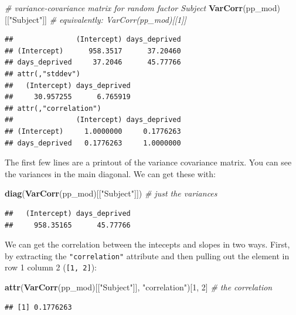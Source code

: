 \documentclass[]{book}
\newenvironment{Shaded}{\begin{snugshade}}{\end{snugshade}}
\newcommand{\CommentTok}[1]{\textcolor[rgb]{0.56,0.35,0.01}{\textit{#1}}}
\newcommand{\DecValTok}[1]{\textcolor[rgb]{0.00,0.00,0.81}{#1}}
\newcommand{\KeywordTok}[1]{\textcolor[rgb]{0.13,0.29,0.53}{\textbf{#1}}}
\newcommand{\NormalTok}[1]{#1}
\newcommand{\StringTok}[1]{\textcolor[rgb]{0.31,0.60,0.02}{#1}}
\begin{document}
\begin{Shaded}
\begin{Highlighting}[]
\CommentTok{# variance-covariance matrix for random factor Subject}
\KeywordTok{VarCorr}\NormalTok{(pp_mod)[[}\StringTok{"Subject"}\NormalTok{]] }\CommentTok{# equivalently: VarCorr(pp_mod)[[1]]}
\end{Highlighting}
\end{Shaded}

\begin{verbatim}
##               (Intercept) days_deprived
## (Intercept)      958.3517      37.20460
## days_deprived     37.2046      45.77766
## attr(,"stddev")
##   (Intercept) days_deprived 
##     30.957255      6.765919 
## attr(,"correlation")
##               (Intercept) days_deprived
## (Intercept)     1.0000000     0.1776263
## days_deprived   0.1776263     1.0000000
\end{verbatim}

The first few lines are a printout of the variance covariance matrix. You can see the variances in the main diagonal. We can get these with:

\begin{Shaded}
\begin{Highlighting}[]
\KeywordTok{diag}\NormalTok{(}\KeywordTok{VarCorr}\NormalTok{(pp_mod)[[}\StringTok{"Subject"}\NormalTok{]]) }\CommentTok{# just the variances}
\end{Highlighting}
\end{Shaded}

\begin{verbatim}
##   (Intercept) days_deprived 
##     958.35165      45.77766
\end{verbatim}

We can get the correlation between the intecepts and slopes in two ways. First, by extracting the \texttt{"correlation"} attribute and then pulling out the element in row 1 column 2 (\texttt{{[}1,\ 2{]}}):

\begin{Shaded}
\begin{Highlighting}[]
\KeywordTok{attr}\NormalTok{(}\KeywordTok{VarCorr}\NormalTok{(pp_mod)[[}\StringTok{"Subject"}\NormalTok{]], }\StringTok{"correlation"}\NormalTok{)[}\DecValTok{1}\NormalTok{, }\DecValTok{2}\NormalTok{] }\CommentTok{# the correlation}
\end{Highlighting}
\end{Shaded}

\begin{verbatim}
## [1] 0.1776263
\end{verbatim}
\end{document}
